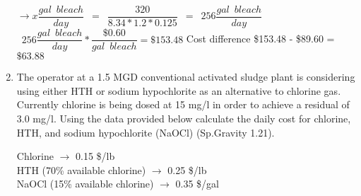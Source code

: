 \documentclass{article}
\begin{document}
\begin{enumerate}
\vspace{0.25cm}
$ \rightarrow x \dfrac{gal \enspace bleach}{day}\enspace = \enspace \dfrac{320}{8.34*1.2*0.125} \enspace = \enspace 256 \dfrac{gal \enspace bleach}{day}$\\
\vspace{0.25cm}
$\enspace 256 \dfrac{gal \enspace bleach}{day}*\dfrac{\$0.60}{gal \enspace bleach}=\$153.48$
\vspace{0.25cm}
Cost difference \$153.48 - \$89.60 = $\boxed{\$63.88}$
\vspace{0.25cm}

\item The operator at a 1.5 MGD conventional activated sludge plant is considering using either HTH or sodium hypochlorite as an alternative to chlorine gas. Currently chlorine is being dosed at 15 mg/l in order to achieve a residual of 3.0 mg/l. Using the data provided below calculate the daily cost for chlorine, HTH, and sodium hypochlorite (NaOCl) (Sp.Gravity 1.21).
 
Chlorine $\rightarrow$ 0.15 \$/lb\\
HTH (70\% available chlorine) $\rightarrow$ 0.25 \$/lb\\
NaOCl (15\% available chlorine) $\rightarrow$ 0.35 \$/gal                                                        

\vspace{0.25cm}


\end{enumerate}
\end{document}
